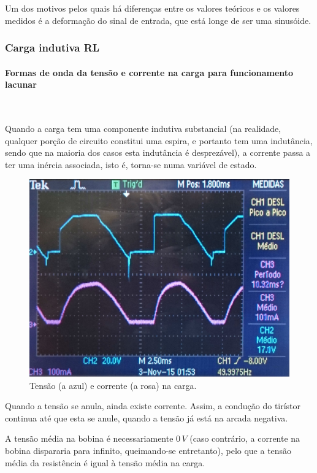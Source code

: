 \documentclass[a4paper,11pt]{article}
\numberwithin{equation}{section}
\begin{document}
Um dos motivos pelos quais há diferenças entre os valores teóricos e os valores medidos é a deformação do sinal de entrada, que está longe de ser uma sinusóide.

\subsubsection{Carga indutiva RL}

\paragraph{Formas de onda da tensão e corrente na carga para funcionamento lacunar} \mbox{}\

Quando a carga tem uma componente indutiva substancial (na realidade, qualquer porção de circuito constitui uma espira, e portanto tem uma indutância, sendo que na maioria dos casos esta indutância é desprezável), a corrente passa a ter uma inércia associada, isto é, torna-se numa variável de estado.

\begin{figure}[H]
	\centering
	\includegraphics[keepaspectratio=true, scale=0.15]{img/DSC_0184}
	\caption{Tensão (a azul) e corrente (a rosa) na carga.}
	\label{fig:tcentradalacuna}
	\vspace{-0.8em}
\end{figure}

Quando a tensão se anula, ainda existe corrente. Assim, a condução do tirístor continua até que esta se anule, quando a tensão já está na arcada negativa.

A tensão média na bobina é necessariamente $0\,V$ (caso contrário, a corrente na bobina dispararia para infinito, queimando-se entretanto), pelo que a tensão média da resistência é igual à tensão média na carga.
\end{document}
